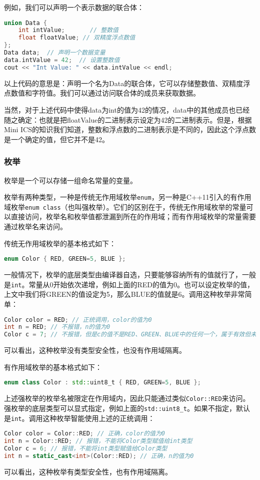 例如，我们可以声明一个表示数据的联合体：
\begin{lstlisting}[language=C++]
union Data {
    int intValue;       // 整数值
    float floatValue; // 双精度浮点数值
};
Data data;  // 声明一个数据变量
data.intValue = 42;  // 设置整数值
cout << "Int Value: " << data.intValue << endl;
\end{lstlisting}
以上代码的意思是：声明一个名为Data的联合体，它可以存储整数值、双精度浮点数值和字符值。我们可以通过访问联合体的成员来获取数据。

当然，对于上述代码中使得data为int的值为42的情况，data中的其他成员也已经随之确定：也就是把floatValue的二进制表示设定为42的二进制表示。但是，根据Mini ICS的知识我们知道，整数和浮点数的二进制表示是不同的，因此这个浮点数是一个确定的值，但它并不是42。

\subsubsection{枚举}

枚举是一个可以存储一组命名常量的变量。

枚举有两种类型，一种是传统无作用域枚举\texttt{enum}，另一种是C++11引入的有作用域枚举\texttt{enum class}（也叫强枚举）。它们的区别在于，传统无作用域枚举的常量可以直接访问，枚举名和枚举值都泄漏到所在的作用域；而有作用域枚举的常量需要通过枚举名来访问。

传统无作用域枚举的基本格式如下：
\begin{lstlisting}[language=C++]
    enum Color { RED, GREEN=5, BLUE };
\end{lstlisting}
一般情况下，枚举的底层类型由编译器自选，只要能够容纳所有的值就行了，一般是\texttt{int}。常量从0开始依次递增，例如上面的RED的值为0。也可以设定枚举的值，上文中我们将GREEN的值设定为5，那么BLUE的值就是6。调用这种枚举非常简单：
\begin{lstlisting}[language=C++]
Color color = RED; // 正统调用，color的值为0
int n = RED; // 不报错，n的值为0
Color c = 7; // 不报错，但是c的值不是RED、GREEN、BLUE中的任何一个，属于有效但未命名的值
\end{lstlisting}
可以看出，这种枚举没有类型安全性，也没有作用域隔离。

有作用域枚举的基本格式如下：
\begin{lstlisting}[language=C++]
    enum class Color : std::uint8_t { RED, GREEN=5, BLUE };
\end{lstlisting}
上述强枚举的枚举名被限定在作用域内，因此只能通过类似\texttt{Color::RED}来访问。强枚举的底层类型可以显式指定，例如上面的\texttt{std::uint8\_t}。如果不指定，默认是\texttt{int}。调用这种枚举智能使用上述的正统调用：
\begin{lstlisting}[language=C++]
Color color = Color::RED; // 正确，color的值为0
int n = Color::RED; // 报错，不能将Color类型赋值给int类型
Color c = 6; // 报错，不能将int类型赋值给Color类型
int n = static_cast<int>(Color::RED); // 正确，n的值为0
\end{lstlisting}
可以看出，这种枚举有类型安全性，也有作用域隔离。

